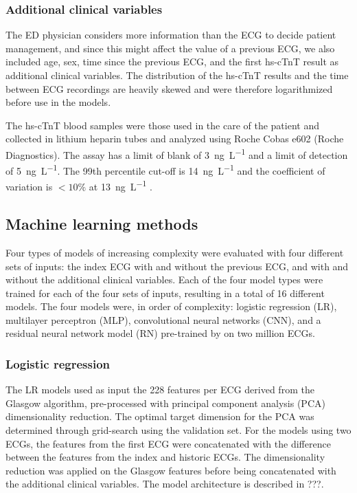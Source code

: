 \documentclass[preprint]{elsarticle}
\begin{document}
\subsubsection{Additional clinical variables}
The ED physician considers more information than the ECG to decide patient management, and since this might affect the value of a previous ECG, we also included age, sex, time since the previous ECG, and the first hs-cTnT result as additional clinical variables. The distribution of the hs-cTnT results and the time between ECG recordings are heavily skewed and were therefore logarithmized before use in the models. 

The hs-cTnT blood samples were those used in the care of the patient and collected in lithium heparin tubes and analyzed using Roche Cobas e602 (Roche Diagnostics). The assay has a limit of blank of \qty{3}{\nano\gram\per\liter} and a limit of detection of \qty{5}{\nano\gram\per\liter}. The 99th percentile cut-off is \qty{14}{\nano\gram\per\liter} and the coefficient of variation is $<10\%$ at \qty{13}{\nano\gram\per\liter} \citep{giannitsis2010}.


\subsection{Machine learning methods}
Four types of models of increasing complexity were evaluated with four different sets of inputs: the index ECG with and without the previous ECG, and with and without the additional clinical variables. Each of the four model types were trained for each of the four sets of inputs, resulting in a total of 16 different models. The four models were, in order of complexity: logistic regression (LR), multilayer perceptron (MLP), convolutional neural networks (CNN), and a residual neural network model (RN) pre-trained by \citet{ribeiro2020} on two million ECGs.

\subsubsection{Logistic regression}
The LR models used as input the 228 features per ECG derived from the Glasgow algorithm, pre-processed with principal component analysis (PCA) dimensionality reduction. The optimal target dimension for the PCA was determined through grid-search using the validation set. For the models using two ECGs, the features from the first ECG were concatenated with the difference between the features from the index and historic ECGs. The dimensionality reduction was applied on the Glasgow features before being concatenated with the additional clinical variables. The model architecture is described in ???.
\end{document}
